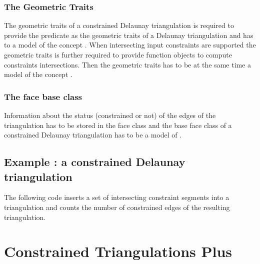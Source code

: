 \subsubsection{The Geometric Traits}
 The geometric traits 
of a constrained Delaunay triangulation is required
to provide the  predicate as the geometric traits
of a Delaunay triangulation and has to a model of the concept
. When intersecting input
constraints
are supported the geometric traits is further required 
to provide function objects to compute constraints intersections.
Then the geometric traits has to be at the same time a model
of the concept .



\subsubsection{The face base class}
Information about the status (constrained or not)
of the edges of the triangulation has to be stored
in the face class
 and the base face class
of a constrained Delaunay triangulation has to be a model
of .




\subsection{Example : a  constrained Delaunay triangulation}
\label{Subsection_2D_Triangulations_Constrained_Delaunay_Example}
The following code inserts a set of intersecting constraint segments
into a triangulation 
and counts the number of constrained edges of the
resulting triangulation.



\section{Constrained Triangulations Plus}
\label{Section_2D_Triangulations_Constrained_Plus}

